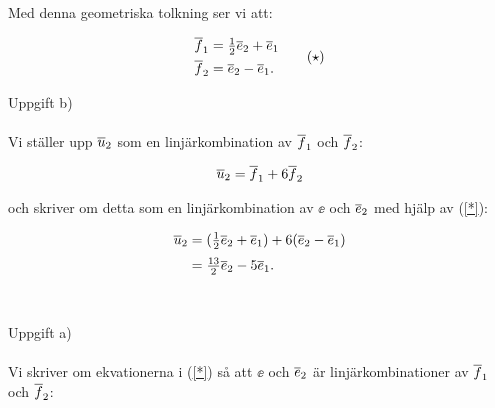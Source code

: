 \documentclass{article}
\begin{document}
\noindent Med denna geometriska tolkning ser vi att:

\begin{equation}
  \begin{aligned}
    \overline{f}_{1} &= \tfrac{1}{2}\overline{e}_{2} + \overline{e}_{1} \\
    \overline{f}_{2} &= \overline{e}_{2} - \overline{e}_{1}\text{.}
  \end{aligned}
  \tag{$\star$}\label{*}
\end{equation}

%
%
%

\newpage

\noindent Uppgift b)
\\
\\
Vi ställer upp $\overline{u}_{2}$ som en linjärkombination av $\overline{f}_{1}$ och $\overline{f}_{2}$:

\begin{gather*}
  \overline{u}_{2} = \overline{f}_{1} + 6\overline{f}_{2}
\end{gather*}

\noindent och skriver om detta som en linjärkombination av $\ee$ och $\overline{e}_{2}$ med hjälp av (\ref{*}):

\begin{align*}
  \overline{u}_{2} &= (\tfrac{1}{2}\overline{e}_{2} + \overline{e}_{1}) + 6(\overline{e}_{2} - \overline{e}_{1})\\[2pt]
  & = \tfrac{13}{2}\overline{e}_{2} - 5\overline{e}_{1}\text{.}
\end{align*}
\\
\\
Uppgift a)
\\
\\
Vi skriver om ekvationerna i (\ref{*}) så att $\ee$ och $\overline{e}_{2}$ är linjärkombinationer av $\overline{f}_{1}$ och $\overline{f}_{2}$:
\end{document}
